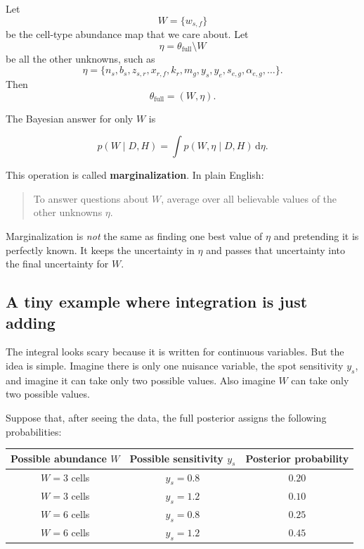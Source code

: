 \documentclass[11pt]{article}
\newcommand{\dd}{\mathrm{d}}
\newcommand{\term}[1]{\textbf{#1}}
\begin{document}
Let
\[
W=\{w_{s,f}\}
\]
be the cell-type abundance map that we care about. Let
\[
\eta=\theta_{\mathrm{full}}\setminus W
\]
be all the other unknowns, such as
\[
\eta=\{n_s,b_s,z_{s,r},x_{r,f},k_r,m_g,y_s,y_e,s_{e,g},\alpha_{e,g},\ldots\}.
\]
Then
\[
\theta_{\mathrm{full}}=(W,\eta).
\]

The Bayesian answer for only $W$ is

\begin{mathbox}
\[
p(W\mid D,H)
=
\int p(W,\eta\mid D,H)\,\dd\eta.
\]
\end{mathbox}

This operation is called \term{marginalization}. In plain English:

\begin{quote}
To answer questions about $W$, average over all believable values of the other unknowns $\eta$.
\end{quote}

\begin{warningbox}
Marginalization is \emph{not} the same as finding one best value of $\eta$ and pretending it is perfectly known. It keeps the uncertainty in $\eta$ and passes that uncertainty into the final uncertainty for $W$.
\end{warningbox}

\subsection{A tiny example where integration is just adding}

The integral looks scary because it is written for continuous variables. But the idea is simple. Imagine there is only one nuisance variable, the spot sensitivity $y_s$, and imagine it can take only two possible values. Also imagine $W$ can take only two possible values.

Suppose that, after seeing the data, the full posterior assigns the following probabilities:

\begin{center}
\begin{tabular}{ccc}
\toprule
Possible abundance $W$ & Possible sensitivity $y_s$ & Posterior probability \\
\midrule
$W=3$ cells & $y_s=0.8$ & $0.20$ \\
$W=3$ cells & $y_s=1.2$ & $0.10$ \\
$W=6$ cells & $y_s=0.8$ & $0.25$ \\
$W=6$ cells & $y_s=1.2$ & $0.45$ \\
\bottomrule
\end{tabular}
\end{center}
\end{document}

